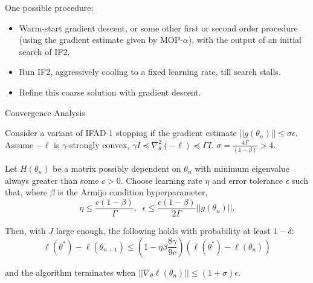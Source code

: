 \documentclass{beamer}
\begin{document}
\begin{frame}{One possible procedure:}
    \begin{itemize}
        \item Warm-start gradient descent, or some other first or second order procedure (using the gradient estimate given by MOP-$\alpha$), with the output of an initial search of IF2. 
        \item \pause Run IF2, aggressively cooling to a fixed learning rate, till search stalls.
        \item \pause Refine this coarse solution with gradient descent.
    \end{itemize}
    \pause
\end{frame}


\begin{frame}{Convergence Analysis}
    \begin{prop}
        \label{thm:convergence}
        
        Consider a variant of IFAD-1 stopping if the gradient estimate $||g(\theta_n)|| \leq \sigma \epsilon$. Assume $-\ell$ is $\gamma$-strongly convex, $\gamma I \preceq \nabla_\theta^2 (-\ell) \preceq \Gamma I$. $\sigma = \frac{4 \Gamma}{(1-\beta)}> 4$.
        
        Let $H(\theta_n)$ be a matrix possibly dependent on $\theta_n$ with minimum eigenvalue always greater than some $c>0$. Choose learning rate $\eta$ and error tolerance $\epsilon$ such that, where $\beta$ is the Armijo condition hyperparameter,
        \begin{equation*}
            \eta \leq \frac{c(1-\beta)}{\Gamma}, \;\; \epsilon \leq \frac{c(1-\beta)}{2\Gamma}||g(\theta_n)||.
        \end{equation*}
        
        Then, with $J$ large enough, the following holds with probability at least $1-\delta$:
        \begin{equation*}
        \ell(\theta^*) - \ell(\theta_{n+1}) \leq \left(1-\eta\beta\frac{8\gamma}{9c}\right)(\ell(\theta^*)-\ell(\theta_n))
        \end{equation*}
        
        and the algorithm terminates when $||\nabla_\theta \ell(\theta_n)|| \leq (1+\sigma) \epsilon$.
        \end{prop}
\end{frame}
\end{document}
